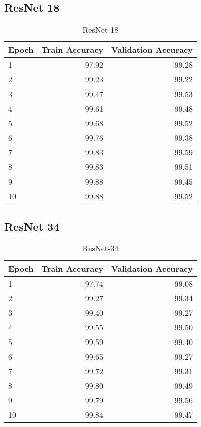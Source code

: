\documentclass[a4paper,11pt,titlepage]{jsarticle}
\begin{document}
\subsection{ResNet 18}
\begin{table}[H]
\centering
\caption{ResNet-18}
\label{tab:ResNet18}
\begin{tabular}{lrr}
\hline
 Epoch &  Train Accuracy &  Validation Accuracy \\
\hline
     1 &           97.92 &                99.28 \\
     2 &           99.23 &                99.22 \\
     3 &           99.47 &                99.53 \\
     4 &           99.61 &                99.48 \\
     5 &           99.68 &                99.52 \\
     6 &           99.76 &                99.38 \\
     7 &           99.83 &                99.59 \\
     8 &           99.83 &                99.51 \\
     9 &           99.88 &                99.45 \\
    10 &           99.88 &                99.52 \\
\hline
\end{tabular}
\end{table}



\subsection{ResNet 34}
\begin{table}[h]
\centering
\caption{ResNet-34}
\label{tab:ResNet34}
\begin{tabular}{lrr}
\hline
 Epoch &  Train Accuracy &  Validation Accuracy \\
\hline
     1 &           97.74 &                99.08 \\
     2 &           99.27 &                99.34 \\
     3 &           99.40 &                99.27 \\
     4 &           99.55 &                99.50 \\
     5 &           99.59 &                99.40 \\
     6 &           99.65 &                99.27 \\
     7 &           99.72 &                99.31 \\
     8 &           99.80 &                99.49 \\
     9 &           99.79 &                99.56 \\
    10 &           99.84 &                99.47 \\
\hline
\end{tabular}
\end{table}
\end{document}
